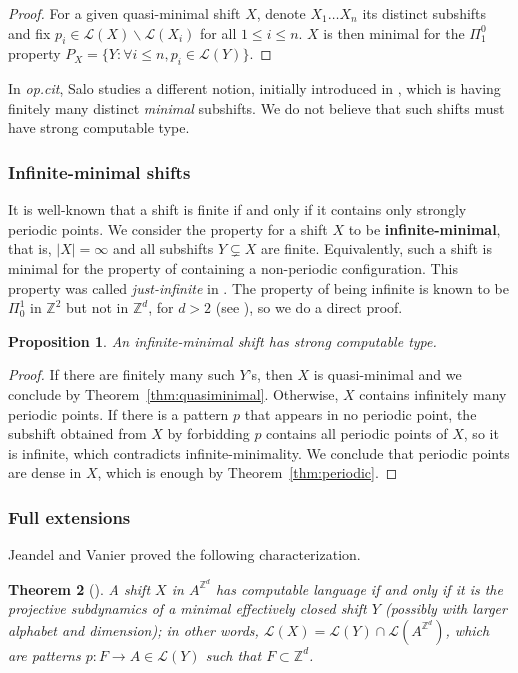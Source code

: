\documentclass[french,american]{article}
\theoremstyle{plain}
\newtheorem{theorem}{Theorem}[section]
\newtheorem{proposition}[theorem]{Proposition}
\theoremstyle{definition}
\theoremstyle{remark}
\theoremstyle{plain}
\newcommand{\Z}{\mathbb{Z}}
\renewcommand{\L}{\mathcal L}
\begin{document}
\begin{proof}
For a given quasi-minimal shift $X$, denote $X_{1}\dots X_{n}$ its
distinct subshifts and fix $p_{i}\in\L(X)\backslash\L(X_{i})$ for
all $1\leq i\leq n$. $X$ is then minimal for the $\Pi_{1}^{0}$
property $P_{X}=\{Y:\forall i\leq n,p_{i}\in\L(Y)\}$.
\end{proof}
In \emph{op.cit}, Salo studies a different notion, initially introduced
in \cite{delvenneblondel}, which is having finitely many distinct
\emph{minimal} subshifts. We do not believe that such shifts must
have strong computable type.

\subsubsection{Infinite-minimal shifts}\label{sec:infminimal}

It is well-known \cite[Theorem 3.8]{ballier2008structural} that a
shift is finite if and only if it contains only strongly periodic
points. We consider the property for a shift $X$ to be \textbf{infinite-minimal},
that is, $|X|=\infty$ and all subshifts $Y\subsetneq X$ are finite. 
Equivalently, such a shift is minimal for the property of containing a non-periodic configuration. This property was called \emph{just-infinite} in \cite{jeandel2017enumeration}.
The property of being infinite is known to be $\Pi_{0}^{1}$ in $\Z^{2}$
but not in $\Z^{d}$, for $d>2$ (see \cite{callard2022aperiodic}),
so we do a direct proof.
\begin{proposition}
An infinite-minimal shift has strong computable type.
\end{proposition}

\begin{proof}
If there are finitely many such $Y$'s, then $X$ is quasi-minimal
and we conclude by Theorem~\ref{thm:quasiminimal}. Otherwise, $X$
contains infinitely many periodic points. If there is a pattern $p$
that appears in no periodic point, the subshift obtained from $X$
by forbidding $p$ contains all periodic points of $X$, so it is
infinite, which contradicts infinite-minimality. We conclude that periodic points are dense in $X$, which
is enough by Theorem~\ref{thm:periodic}.
\end{proof}

\subsubsection{Full extensions}

Jeandel and Vanier proved the following characterization.
\begin{theorem}[\cite{jeandel2019characterization}]
\foreignlanguage{american}{ A shift $X$ in $A^{\mathbb{Z}^{d}}$
has computable language if and only if it is the \emph{projective subdynamics} of a minimal effectively closed
shift $Y$ (possibly with larger alphabet and dimension); in other words,
$\mathcal{L}(X)=\mathcal{L}(Y)\cap \mathcal L(A^{\mathbb{Z}^{d}})$, which are patterns $p : F\to A \in\mathcal L(Y)$ such that $F\subset \mathbb{Z}^{d}$.}
\end{theorem}
\end{document}
